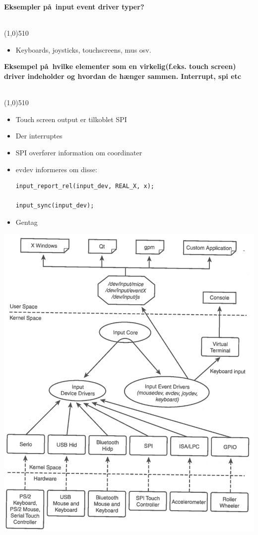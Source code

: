 \documentclass{paper}
\begin{document}
\begin{large}\textbf{Eksempler p\aa\ input event driver typer?}\end{large}\\
\line(1,0){510}
\begin{itemize}
\item Keyboards, joysticks, touchscreens, mus osv.\\
\end{itemize}
\begin{large}\textbf{Eksempel p\aa\ hvilke elementer som en virkelig(f.eks. touch screen) driver indeholder og hvordan de h\ae nger sammen. Interrupt, spi etc}\end{large}\\
\line(1,0){510}
\begin{itemize}
\item Touch screen output er tilkoblet SPI
\item Der interruptes
\item SPI overf\o rer information om coordinater
\item evdev informeres om disse:
\begin{lstlisting}
input_report_rel(input_dev, REAL_X, x);

input_sync(input_dev);
\end{lstlisting}
\item Gentag
\end{itemize}

\includegraphics[scale=1,angle=0.72]{inputsys.png}
\end{document}
